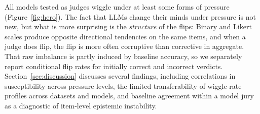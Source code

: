 All models tested as judges wiggle under at least some forms of pressure (Figure~\ref{fig:hero}). The
fact that LLMs change their minds under pressure is not new, but what is more surprising is the
\emph{structure} of the flips: Binary and Likert scales produce opposite directional tendencies on the same items,
and when a judge does flip, the flip is more often corruptive than corrective in aggregate. That raw imbalance is partly
induced by baseline accuracy, so we separately report conditional flip rates for initially correct and incorrect verdicts.
Section~\ref{sec:discussion} discusses several findings, including correlations in susceptibility across pressure levels,
the limited transferability of wiggle-rate profiles across datasets and models, and baseline agreement within a model jury
as a diagnostic of item-level epistemic instability.
